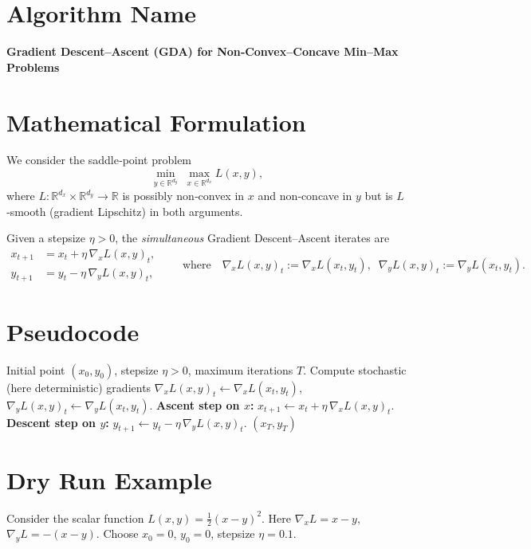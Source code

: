 \documentclass{article}
\newcommand{\gradx}{\nabla_x L(x,y)}
\newcommand{\grady}{\nabla_y L(x,y)}
\begin{document}
\section*{Algorithm Name}
\textbf{Gradient Descent–Ascent (GDA) for Non‑Convex–Concave Min–Max Problems}

\section*{Mathematical Formulation}
We consider the saddle‑point problem  
\[
\min_{y\in\mathbb{R}^{d_y}}\;\max_{x\in\mathbb{R}^{d_x}} L(x,y),
\]
where $L:\mathbb{R}^{d_x}\times\mathbb{R}^{d_y}\to\mathbb{R}$ is possibly non‑convex in $x$ and non‑concave in $y$ but is $L$‑smooth (gradient Lipschitz) in both arguments.

Given a stepsize $\eta>0$, the \emph{simultaneous} Gradient Descent–Ascent iterates are
\[
\boxed{
\begin{aligned}
x_{t+1} &= x_t + \eta\,\gradx_t,\\[4pt]
y_{t+1} &= y_t - \eta\,\grady_t,
\end{aligned}}
\qquad\text{where}\quad
\gradx_t:=\nabla_x L(x_t,y_t),\;\;
\grady_t:=\nabla_y L(x_t,y_t).
\]

\section*{Pseudocode}
\begin{algorithm}[H]
\caption{Gradient Descent–Ascent (GDA)}
\begin{algorithmic}[1]
\Require Initial point $(x_0,y_0)$, stepsize $\eta>0$, maximum iterations $T$.
    \State Compute stochastic (here deterministic) gradients 
          $\gradx_t\gets \nabla_x L(x_t,y_t)$,
          $\grady_t\gets \nabla_y L(x_t,y_t)$.
    \State \textbf{Ascent step on $x$:} $x_{t+1}\gets x_t+\eta\,\gradx_t$.
    \State \textbf{Descent step on $y$:} $y_{t+1}\gets y_t-\eta\,\grady_t$.
\EndFor
\State \Return $(x_T,y_T)$
\end{algorithmic}
\end{algorithm}

\section*{Dry Run Example}
Consider the scalar function $L(x,y)=\frac12(x-y)^2$.  
Here $\nabla_x L = x-y$, $\nabla_y L = -(x-y)$.  Choose $x_0=0$, $y_0=0$, stepsize $\eta=0.1$.
\end{document}
